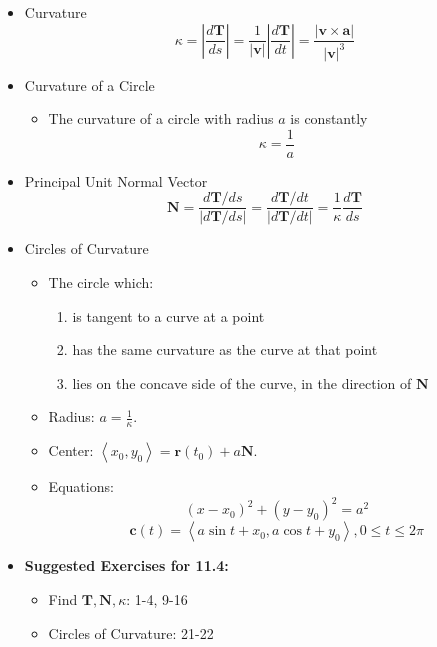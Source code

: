 \documentclass[12pt]{article}
\renewcommand{\vec}[1]{\mathbf{#1}}
\newcommand{\<}{\left<}
\renewcommand{\>}{\right>}
\begin{document}
  \begin{itemize}
    \item Curvature
      \[\kappa = \left|\frac{d\vec{T}}{ds}\right| = \frac{1}{|\vec{v}|}\left|\frac{d\vec{T}}{dt}\right| = \frac{|\vec{v} \times \vec{a}|}{|\vec{v}|^3}\]
    
    \item Curvature of a Circle
    
      \begin{itemize}
      \item The curvature of a circle with radius $a$ is constantly \[\kappa = \frac{1}{a}\]
      \end{itemize}
    
    \item Principal Unit Normal Vector
      \[\vec{N} = \frac{d\vec{T}/ds}{|d\vec{T}/ds|} = \frac{d\vec{T}/dt}{|d\vec{T}/dt|} = \frac{1}{\kappa} \frac{d\vec{T}}{ds}\]
    
    \item Circles of Curvature
    
      \begin{itemize}
      \item The circle which:
        \begin{enumerate}
        \item is tangent to a curve at a point
        \item has the same curvature as the curve at that point
        \item lies on the concave side of the curve, in the direction of $\vec{N}$
        \end{enumerate}
      \item Radius: $a = \displaystyle\frac{1}{\kappa}$.
      \item Center: $\<x_0,y_0\> = \vec{r}(t_0)+a\vec{N}$.
      \item Equations: 
        \[(x-x_0)^2+(y-y_0)^2=a^2\]
        \[\vec{c}(t) = \<a\sin t+x_0,a\cos t+y_0\>, 0\leq t\leq 2\pi\]
      \end{itemize}
      
    \item \textbf{ Suggested Exercises for 11.4:}
    
      \begin{itemize}
      \item Find $\vec{T},\vec{N},\kappa$: 1-4, 9-16
      \item Circles of Curvature: 21-22
      \end{itemize}
    
  \end{itemize}
\end{document}
